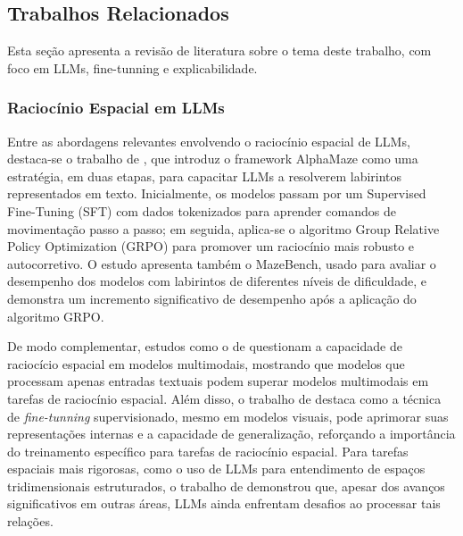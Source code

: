 \subsection{Trabalhos Relacionados}

Esta seção apresenta a revisão de literatura sobre o tema deste trabalho, com foco em LLMs, fine-tunning e explicabilidade.

\subsubsection{Raciocínio Espacial em LLMs}

Entre as abordagens relevantes envolvendo o raciocínio espacial de LLMs, destaca-se o trabalho de \cite{dao2025alphamaze}, que introduz o framework AlphaMaze como uma estratégia, em duas etapas, para capacitar LLMs a resolverem labirintos representados em texto. Inicialmente, os modelos passam por um Supervised Fine-Tuning (SFT) com dados tokenizados para aprender comandos de movimentação passo a passo; em seguida, aplica-se o algoritmo Group Relative Policy Optimization (GRPO) para promover um raciocínio mais robusto e autocorretivo. O estudo apresenta também o MazeBench, usado para avaliar o desempenho dos modelos com labirintos de diferentes níveis de dificuldade, e demonstra um incremento significativo de desempenho após a aplicação do algoritmo GRPO.

De modo complementar, estudos como o de \cite{jiang2024supervised} questionam a capacidade de raciocício espacial em modelos multimodais, mostrando que modelos que processam apenas entradas textuais podem superar modelos multimodais em tarefas de raciocínio espacial. Além disso, o trabalho de \cite{wang2024picture} destaca como a técnica de \textit{fine-tunning} supervisionado, mesmo em modelos visuais, pode aprimorar suas representações internas e a capacidade de generalização, reforçando a importância do treinamento específico para tarefas de raciocínio espacial. Para tarefas espaciais mais rigorosas, como o uso de LLMs para entendimento de espaços tridimensionais estruturados, o trabalho de \cite{algo} demonstrou que, apesar dos avanços significativos em outras áreas, LLMs ainda enfrentam desafios ao processar tais relações.